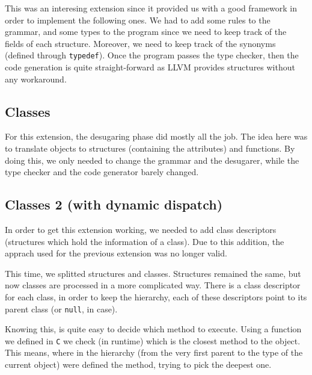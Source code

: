 \documentclass{article}
\begin{document}
This was an interesing extension since it provided us with a good framework in order to implement the following ones. We had to add some rules to the grammar, and some types to the program since we need to keep track of the fields of each structure. Moreover, we need to keep track of the synonyms (defined through \texttt{typedef}). Once the program passes the type checker, then the code generation is quite straight-forward as LLVM provides structures without any workaround.


\subsection{Classes}
For this extension, the desugaring phase did mostly all the job. The idea here was to translate objects to structures (containing the attributes) and functions. By doing this, we only needed to change the grammar and the desugarer, while the type checker and the code generator barely changed.

\subsection{Classes 2 (with dynamic dispatch)}
In order to get this extension working, we needed to add class descriptors (structures which hold the information of a class). Due to this addition, the apprach used for the previous extension was no longer valid.

This time, we splitted structures and classes. Structures remained the same, but now classes are processed in a more complicated way. There is a class descriptor for each class, in order to keep the hierarchy, each of these descriptors point to its parent class (or \texttt{null}, in case).

Knowing this, is quite easy to decide which method to execute. Using a function we defined in \texttt{C} we check (in runtime) which is the closest method to the object. This means, where in the hierarchy (from the very first parent to the type of the current object) were defined the method, trying to pick the deepest one.
\end{document}
